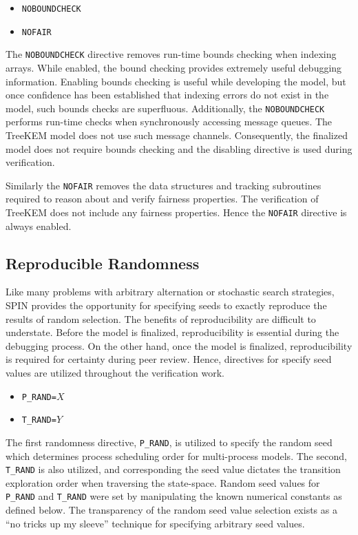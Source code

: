 \begin{itemize}
\item
  \texttt{NOBOUNDCHECK}
\item
  \texttt{NOFAIR}
\end{itemize}

The \texttt{NOBOUNDCHECK} directive removes run-time bounds checking when indexing arrays.
While enabled, the bound checking provides extremely useful debugging information.
Enabling bounds checking is useful while developing the model, but once confidence has been established that indexing errors do not exist in the model, such bounds checks are superfluous.
Additionally, the \texttt{NOBOUNDCHECK} performs run-time checks when synchronously accessing message queues.
The TreeKEM model does not use such message channels.
Consequently, the finalized model does not require bounds checking and the disabling directive is used during verification.

Similarly the \texttt{NOFAIR} removes the data structures and tracking subroutines required to reason about and verify fairness properties.
The verification of TreeKEM does not include any fairness properties.
Hence the \texttt{NOFAIR} directive is always enabled.


\hypertarget{reproducible-randomness}{%
\subsection{Reproducible Randomness}\label{reproducible-randomness}}

Like many problems with arbitrary alternation or stochastic search strategies, SPIN provides the opportunity for specifying seeds to exactly reproduce the results of random selection.
The benefits of reproducibility are difficult to understate.
Before the model is finalized, reproducibility is essential during the debugging process.
On the other hand, once the model is finalized, reproducibility is required for certainty during peer review.
Hence, directives for specify seed values are utilized throughout the verification work.

\begin{itemize}
\item
  \texttt{P\_RAND=}\(X\)
\item
  \texttt{T\_RAND=}\(Y\)
\end{itemize}

The first randomness directive, \texttt{P\_RAND}, is utilized to specify the random seed which determines process scheduling order for multi-process models.
The second, \texttt{T\_RAND} is also utilized, and corresponding the seed value dictates the transition exploration order when traversing the state-space.
Random seed values for \texttt{P\_RAND} and \texttt{T\_RAND} were set by manipulating the known numerical constants as defined below.
The transparency of the random seed value selection exists as a ``no tricks up my sleeve'' technique for specifying arbitrary seed values.

